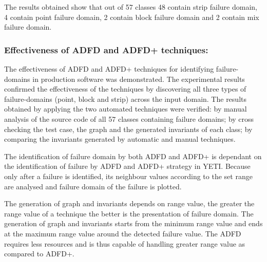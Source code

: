 \documentclass[runningheads,a4paper]{llncs}
\begin{document}
The results obtained show that out of 57 classes 48 contain strip failure domain, 4 contain point failure domain, 2 contain block failure domain and 2 contain mix failure domain.








\subsubsection{Effectiveness of ADFD and ADFD+ techniques:}
The effectiveness of ADFD and ADFD+ techniques for identifying failure-domains in production software was demonstrated. The experimental results confirmed the effectiveness of the techniques by discovering all three types of failure-domains (point, block and strip) across the input domain. The results obtained by applying the two automated techniques were verified: by manual analysis of the source code of all 57 classes containing failure domains; by cross checking the test case, the graph and the generated invariants of each class; by comparing the invariants generated by automatic and manual techniques. 

The identification of failure domain by both ADFD and ADFD+ is dependant on the identification of failure by ADFD and ADFD+ strategy in YETI. Because only after a failure is identified, its neighbour values according to the set range are analysed and failure domain of the failure is plotted.

The generation of graph and invariants depends on range value, the greater the range value of a technique the better is the presentation of failure domain. The generation of graph and invariants starts from the minimum range value and ends at the maximum range value around the detected failure value. The ADFD requires less resources and is thus capable of handling  greater range value as compared to ADFD+.  
\end{document}
